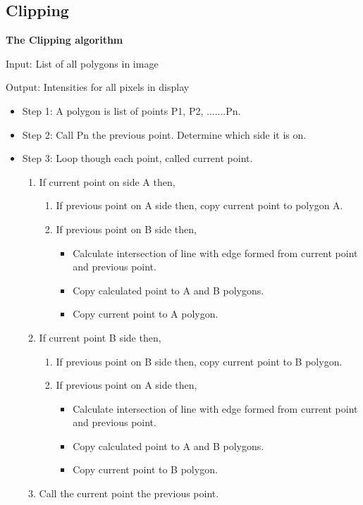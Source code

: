 \documentclass{acmsiggraph}               %
\begin{document}
\subsection{Clipping}
\label{sec:Clipping}


\par \textbf{ The Clipping algorithm} \cite{0}
\par Input: List of all polygons in image
\par Output: Intensities for all pixels in display

\begin{itemize}
\item Step 1: A polygon is list of points P1, P2, .......Pn. 
\item Step 2: Call Pn the previous point. Determine which side it is on.
\item Step 3: Loop though each point, called current point.
\begin{enumerate}
\item If current point on side A then,

\begin{enumerate}
\item If previous point on A side then,
copy current point to polygon A.
\item If previous point on B side then,
\begin{itemize}
\item Calculate intersection of line with edge formed from current point and 
previous point.
\item Copy calculated point to A and B polygons.
\item Copy current point to A polygon.
\end{itemize}
\end{enumerate}
\item If current point B side then,
\begin{enumerate}
\item If previous point on B side then, copy current point to B polygon.
\item If previous point on A side then,
\begin{itemize}
\item Calculate intersection of line with edge formed from current point and 
previous point.
\item Copy calculated point to A and B polygons.
\item Copy current point to B polygon.
\end{itemize}
\end{enumerate}
\item Call the current point the previous point.
\end{enumerate}
\end{itemize}
\end{document}
